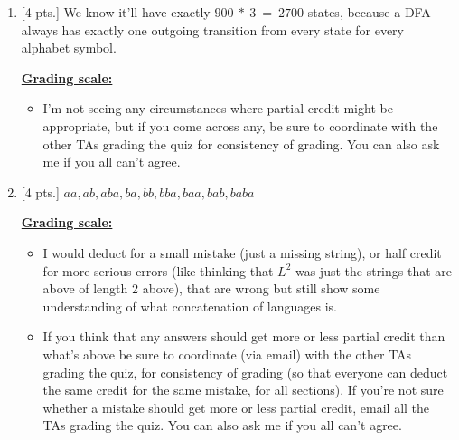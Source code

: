 \documentclass[11pt,fleqn]{article}
\begin{document}
  \begin{enumerate}

    \addtolength{\itemsep}{4mm}

    \item {[4 pts.]} We know it'll have exactly $900 \: * \: 3 \ = \ 2700$
          states, because a DFA always has exactly one outgoing transition
          from every state for every alphabet symbol.
          
          \begin{info}{\textbf{\underline{Grading scale:}}}

            \begin{itemize}

              \addtolength{\itemsep}{2mm}

              \item I'm not seeing any circumstances where partial credit
                    might be appropriate, but if you come across any, be
                    sure to coordinate with the other TAs grading the quiz
                    for consistency of grading.  You can also ask me if you
                    all can't agree.

            \end{itemize}

          \end{info}

    \item {[4 pts.]} \( aa, ab, aba, ba, bb, bba, baa, bab, baba \)
          
          \begin{info}{\textbf{\underline{Grading scale:}}}

            \begin{itemize}

              \addtolength{\itemsep}{2mm}

              \item I would deduct  for a small mistake (just a
                    missing string), or half credit for more serious errors
                    (like thinking that $L^2$ was just the strings that are
                    above of length 2 above), that are wrong but still show
                    some understanding of what concatenation of languages
                    is.

              \item If you think that any answers should get more or less
                    partial credit than what's above be sure to coordinate
                    (via email) with the other TAs grading the quiz, for
                    consistency of grading (so that everyone can deduct the
                    same credit for the same mistake, for all sections).  If
                    you're not sure whether a mistake should get more or
                    less partial credit, email all the TAs grading the quiz.
                    You can also ask me if you all can't agree.


\end{itemize}
\end{info}
\end{enumerate}
\end{document}

